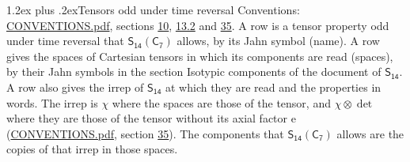 \documentclass[10pt,a4paper]{article}
\makeatletter
\renewcommand\section{\@startsection{section}{1}{\z@}{-3ex plus -1ex minus -.2ex}%
  {1.2ex plus .2ex}{\normalfont\large\sffamily\bfseries\color{parttitle}}}
\numberwithin{equation}{section}
\newcommand{\grp}[1]{\mathsf{#1}}
\newcommand{\irrprod}{\otimes}
\makeatother
\begin{document}
\section{Tensors odd under time reversal}\label{s:time_odd}
Conventions: \href{../../CONVENTIONS.pdf}{CONVENTIONS.pdf}, sections \href{../../../rotation/CONVENTIONS.pdf\#conv.10}{10}, \href{../../../rotation/CONVENTIONS.pdf\#conv.13.2}{13.2} and \href{../../CONVENTIONS.pdf\#conv.35}{35}.
\leavevmode\label{n:head.name.property}A row is a tensor property odd under time reversal that $\grp{S_{14}}(\grp{C_{7}})$ allows, by its Jahn symbol (name). \label{n:head.spaces}A row gives the spaces of Cartesian tensors in which its components are read (spaces), by their Jahn symbols in the section Isotypic components of the document of \href{../../../rotation/data/pdf/S14.pdf}{$\grp{S_{14}}$}. \label{n:head.properties}A row also gives the irrep of $\grp{S_{14}}$ at which they are read and the properties in words. The irrep is $\chi$ where the spaces are those of the tensor, and $\chi \irrprod \det$ where they are those of the tensor without its axial factor e (\href{../../CONVENTIONS.pdf}{CONVENTIONS.pdf}, section \href{../../CONVENTIONS.pdf\#conv.35}{35}). The components that $\grp{S_{14}}(\grp{C_{7}})$ allows are the copies of that irrep in those spaces.
\end{document}
